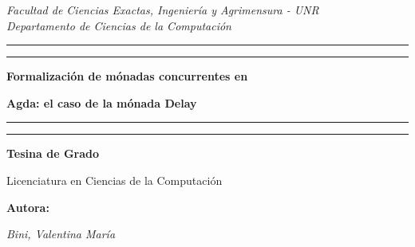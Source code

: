\hypersetup{pageanchor=false}
\begin{titlepage}  %

	\centering %
	\scshape %
	
	\textit{\large Facultad de Ciencias Exactas, Ingeniería y Agrimensura - UNR\\Departamento de Ciencias de la Computación }
	
	\vspace{2\baselineskip}
	
	
	\rule{\textwidth}{1.6pt}\vspace*{-\baselineskip}\vspace*{2pt} %
	\rule{\textwidth}{0.4pt} %
	
	\vspace{\baselineskip} %
	
	{\LARGE \textbf{Formalización de mónadas concurrentes en}}
	
	{\LARGE \textbf{Agda: el caso de la mónada
Delay}} %
	\vspace{\baselineskip} %
	
	\rule{\textwidth}{0.4pt}\vspace*{-\baselineskip}\vspace{3.2pt} %
	\rule{\textwidth}{1.6pt} %
	
	\vspace{3\baselineskip} %
	
	
	{\LARGE \textbf{Tesina de Grado}}

	{\Large Licenciatura en Ciencias de la Computación}
	\vspace*{3\baselineskip} %

	
	
	\Large{\textbf{Autora:}}
	
	
    {\itshape\LARGE Bini, Valentina María}
	

\end{titlepage}
